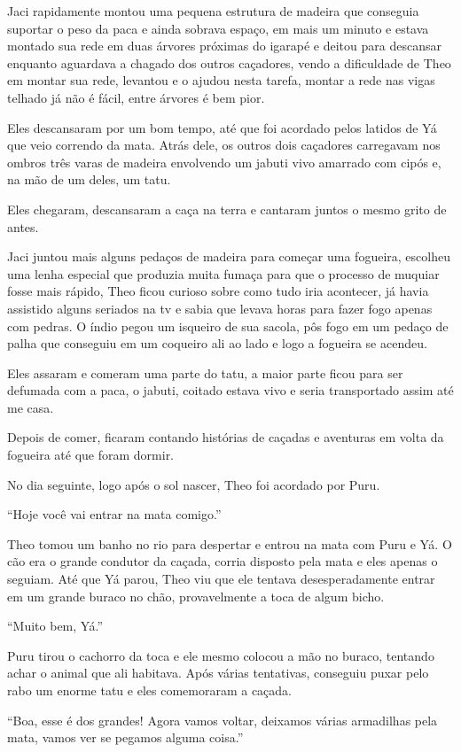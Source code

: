 Jaci rapidamente montou uma pequena estrutura de madeira que conseguia
suportar o peso da paca e ainda sobrava espaço, em mais um minuto e
estava montado sua rede em duas árvores próximas do igarapé e deitou
para descansar enquanto aguardava a chagado dos outros caçadores, vendo
a dificuldade de Theo em montar sua rede, levantou e o ajudou nesta
tarefa, montar a rede nas vigas telhado já não é fácil, entre árvores é
bem pior.

Eles descansaram por um bom tempo, até que foi acordado pelos latidos de
Yá que veio correndo da mata. Atrás dele, os outros dois caçadores
carregavam nos ombros três varas de madeira envolvendo um jabuti vivo
amarrado com cipós e, na mão de um deles, um tatu.

Eles chegaram, descansaram a caça na terra e cantaram juntos o mesmo
grito de antes.

Jaci juntou mais alguns pedaços de madeira para começar uma fogueira,
escolheu uma lenha especial que produzia muita fumaça para que o
processo de muquiar fosse mais rápido, Theo ficou curioso sobre como
tudo iria acontecer, já havia assistido alguns seriados na tv e sabia
que levava horas para fazer fogo apenas com pedras. O índio pegou um
isqueiro de sua sacola, pôs fogo em um pedaço de palha que conseguiu em
um coqueiro ali ao lado e logo a fogueira se acendeu.

Eles assaram e comeram uma parte do tatu, a maior parte ficou para ser
defumada com a paca, o jabuti, coitado estava vivo e seria transportado
assim até me casa.

Depois de comer, ficaram contando histórias de caçadas e aventuras em
volta da fogueira até que foram dormir.

No dia seguinte, logo após o sol nascer, Theo foi acordado por Puru.

``Hoje você vai entrar na mata comigo.''

Theo tomou um banho no rio para despertar e entrou na mata com Puru e
Yá. O cão era o grande condutor da caçada, corria disposto pela mata e
eles apenas o seguiam. Até que Yá parou, Theo viu que ele tentava
desesperadamente entrar em um grande buraco no chão, provavelmente a
toca de algum bicho.

``Muito bem, Yá.''

Puru tirou o cachorro da toca e ele mesmo colocou a mão no buraco,
tentando achar o animal que ali habitava. Após várias tentativas,
conseguiu puxar pelo rabo um enorme tatu e eles comemoraram a caçada.

``Boa, esse é dos grandes! Agora vamos voltar, deixamos várias
armadilhas pela mata, vamos ver se pegamos alguma coisa.''

